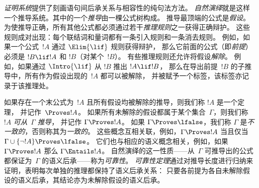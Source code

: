 \emph{证明系统}提供了刻画语句间后承关系与相容性的纯句法方法。
\emph{自然演绎}就是这样一个推导系统。其中的一个\emph{推导}由一棵公式树构成。
推导最顶端的公式是\emph{假设}。
为使推导正确，所有其他公式都必须通过若干\emph{推理规则}之一获得正确辩护。
这些规则成对出现：每个联结词和量词都有一条引入规则和一条消去规则。
例如，如果一个公式~$!A$ 通过 $\Elim{\lif}$ 规则获得辩护，
那么它前面的公式（即\emph{前提}）必须是 $!B \lif !A$ 和 $!B$（对某个~$!B$）。
有些推理规则还允许将假设\emph{解除}。
例如，如果通过 $\Intro{\lif}$ 从 $!B$ 推出 $!A \lif !B$，
那么在导出前提~$!B$ 的子推导中，所有作为假设出现的~$!A$ 都可以被解除，
并被赋予一个标签，该标签亦记录于该推理处。

如果存在一个末公式为~$!A$ 且所有假设均被解除的推导，则我们称 $!A$ 是一个定理，
并记作~$\Proves !A$。
如果所有未解除的假设都属于某个集合~$\Gamma$，则我们称 $!A$ \emph{可从}~$\Gamma$ \emph{推导}，
并记作 $\Gamma \Proves !A$。
如果 $\Gamma \Proves \lfalse$，我们称 $\Gamma$ 是\emph{不一致的}，否则称其为\emph{一致的}。
这些概念互相关联，例如，$\Gamma \Proves !A$ 当且仅当 $\Gamma \cup \{\lnot !A\} \Proves
\lfalse$。
它们也与相应的语义概念相关，例如，如果 $\Gamma \Proves !A$ 那么 $\Gamma \Entails !A$。
自然演绎的这一性质——从~$\Gamma$ 可推导出的公式都保证为~$\Gamma$ 的语义后承——称为\emph{可靠性}。
\emph{可靠性定理}通过对推导长度进行归纳来证明，表明每次单独的推理都保持了语义后承关系：
只要各前提为各自未解除假设的语义后承，其结论亦为未解除假设的语义后承。